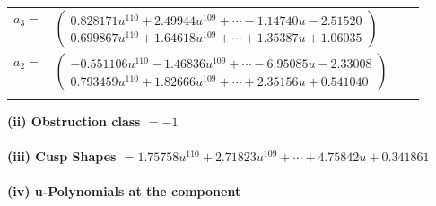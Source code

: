 \documentclass[1p]{elsarticle_modified}
\theoremstyle{definition}
\begin{document}
\begin{tabular}{m{7pt} m{180pt} m{7pt} m{180pt} }
\flushright $a_{3}=$&$\begin{pmatrix}0.828171 u^{110}+2.49944 u^{109}+\cdots-1.14740 u-2.51520\\0.699867 u^{110}+1.64618 u^{109}+\cdots+1.35387 u+1.06035\end{pmatrix}$ \\
\flushright $a_{2}=$&$\begin{pmatrix}-0.551106 u^{110}-1.46836 u^{109}+\cdots-6.95085 u-2.33008\\0.793459 u^{110}+1.82666 u^{109}+\cdots+2.35156 u+0.541040\end{pmatrix}$\\&\end{tabular}
\flushleft \textbf{(ii) Obstruction class $= -1$}\\~\\
\flushleft \textbf{(iii) Cusp Shapes $= 1.75758 u^{110}+2.71823 u^{109}+\cdots+4.75842 u+0.341861$}\\~\\
\newpage\renewcommand{\arraystretch}{1}
\flushleft \textbf{(iv) u-Polynomials at the component}\newline \\
\end{document}
